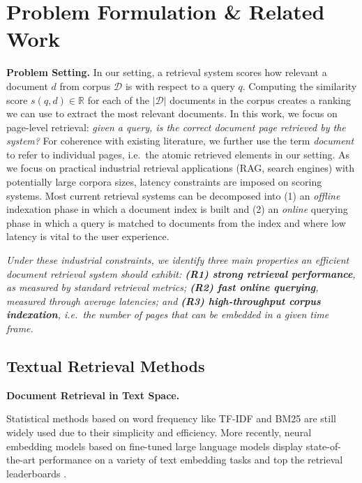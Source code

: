 \section{Problem Formulation \& Related Work}

\noindent\textbf{Problem Setting.}
In our setting, a retrieval system scores how relevant a document $d$ from corpus $\mathcal{D}$ is with respect to a query $q$. Computing the similarity score $s(q, d) \in \mathbb{R}$ for each of the $|\mathcal{D}|$ documents in the corpus creates a ranking we can use to extract the most relevant documents. In this work, we focus on page-level retrieval: \textit{given a query, is the correct document page retrieved by the system?} For coherence with existing literature, we further use the term \textit{document} to refer to individual pages, i.e.\ the atomic retrieved elements in our setting. As we focus on practical industrial retrieval applications (RAG, search engines) with potentially large corpora sizes, latency constraints are imposed on scoring systems. Most current retrieval systems can be decomposed into (1) an \textit{offline} indexation phase in which a document index is built and (2) an \textit{online} querying phase in which a query is matched to documents from the index and where low latency is vital to the user experience. 


\label{subsec:constraints}
\noindent\textit{Under these industrial constraints, we identify three main properties an efficient document retrieval system should exhibit: \textbf{(R1) strong retrieval performance}, as measured by standard retrieval metrics; \textbf{(R2) fast online querying}, measured through average latencies; and \textbf{(R3) high-throughput corpus indexation}, i.e.\ the number of pages that can be embedded in a given time frame.}


\subsection{Textual Retrieval Methods}
\noindent\textbf{Document Retrieval in Text Space.}

Statistical methods based on word frequency like TF-IDF  and BM25  are still widely used due to their simplicity and efficiency. More recently, neural embedding models based on fine-tuned large language models display state-of-the-art performance on a variety of text embedding tasks and top the retrieval leaderboards . 

